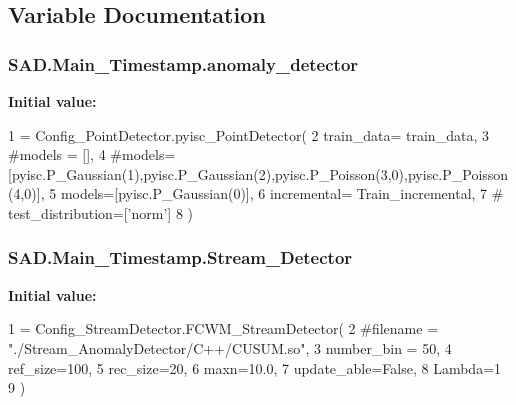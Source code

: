 \subsection{Variable Documentation}
\subsubsection[{\texorpdfstring{anomaly\+\_\+detector}{anomaly_detector}}]{\setlength{\rightskip}{0pt plus 5cm}S\+A\+D.\+Main\+\_\+\+Timestamp.\+anomaly\+\_\+detector}\hypertarget{namespaceSAD_1_1Main__Timestamp_a5c21961c6ce071c8210d5d0bc8863e4e}{}\label{namespaceSAD_1_1Main__Timestamp_a5c21961c6ce071c8210d5d0bc8863e4e}
{\bfseries Initial value\+:}
\begin{DoxyCode}
1 = Config\_PointDetector.pyisc\_PointDetector(
2     train\_data= train\_data,
3     \textcolor{comment}{#models = [],}
4     \textcolor{comment}{#models=[pyisc.P\_Gaussian(1),pyisc.P\_Gaussian(2),pyisc.P\_Poisson(3,0),pyisc.P\_Poisson(4,0)],}
5     models=[pyisc.P\_Gaussian(0)],
6     incremental= Train\_incremental,
7     \textcolor{comment}{# test\_distribution=['norm']}
8 )
\end{DoxyCode}
\subsubsection[{\texorpdfstring{Stream\+\_\+\+Detector}{Stream_Detector}}]{\setlength{\rightskip}{0pt plus 5cm}S\+A\+D.\+Main\+\_\+\+Timestamp.\+Stream\+\_\+\+Detector}\hypertarget{namespaceSAD_1_1Main__Timestamp_a1ad8864da27da3d528350575f27d8d94}{}\label{namespaceSAD_1_1Main__Timestamp_a1ad8864da27da3d528350575f27d8d94}
{\bfseries Initial value\+:}
\begin{DoxyCode}
1 = Config\_StreamDetector.FCWM\_StreamDetector(
2     \textcolor{comment}{#filename = "./Stream\_AnomalyDetector/C++/CUSUM.so",}
3     number\_bin = 50,
4     ref\_size=100,
5     rec\_size=20,
6     maxn=10.0,
7     update\_able=\textcolor{keyword}{False},
8     Lambda=1
9 )
\end{DoxyCode}
